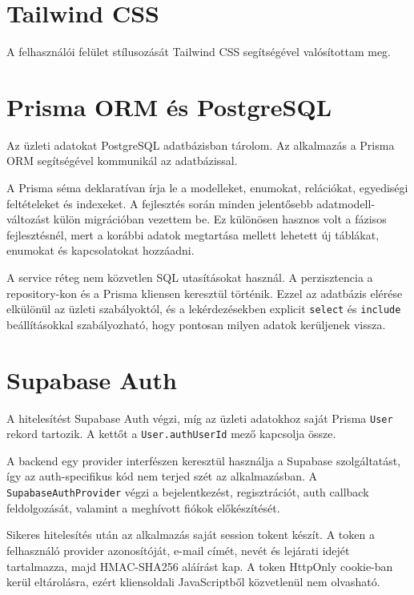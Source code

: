 \documentclass[11pt,a4paper]{report}
\begin{document}
    \section{Tailwind CSS}

    A felhasználói felület stílusozását Tailwind CSS segítségével valósítottam meg.

    \section{Prisma ORM és PostgreSQL}

    Az üzleti adatokat PostgreSQL adatbázisban tárolom. Az alkalmazás a Prisma ORM
    segítségével kommunikál az adatbázissal.

    A Prisma séma deklaratívan írja le a modelleket, enumokat, relációkat,
    egyediségi feltételeket és indexeket. A fejlesztés során minden jelentősebb
    adatmodell-változást külön migrációban vezettem be. Ez különösen hasznos volt a
    fázisos fejlesztésnél, mert a korábbi adatok megtartása mellett lehetett új
    táblákat, enumokat és kapcsolatokat hozzáadni.

    A service réteg nem közvetlen SQL utasításokat használ. A perzisztencia a
    repository-kon és a Prisma kliensen keresztül történik. Ezzel az adatbázis
    elérése elkülönül az üzleti szabályoktól, és a lekérdezésekben explicit
    \texttt{select} és \texttt{include} beállításokkal szabályozható, hogy pontosan
    milyen adatok kerüljenek vissza.

    \section{Supabase Auth}

    A hitelesítést Supabase Auth végzi, míg az üzleti adatokhoz saját Prisma
    \texttt{User} rekord tartozik. A kettőt a \texttt{User.authUserId} mező
    kapcsolja össze.

    A backend egy provider interfészen keresztül használja a Supabase szolgáltatást,
    így az auth-specifikus kód nem terjed szét az alkalmazásban. A
    \texttt{SupabaseAuthProvider} végzi a bejelentkezést, regisztrációt, auth
    callback feldolgozását, valamint a meghívott fiókok előkészítését.

    Sikeres hitelesítés után az alkalmazás saját session tokent készít. A token a
    felhasználó provider azonosítóját, e-mail címét, nevét és lejárati idejét
    tartalmazza, majd HMAC-SHA256 aláírást kap. A token HttpOnly cookie-ban kerül
    eltárolásra, ezért kliensoldali JavaScriptből közvetlenül nem olvasható.
\end{document}
